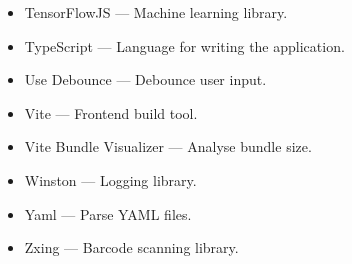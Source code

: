 \documentclass[11pt, twoside, a4paper]{report}
\begin{document}
\begin{itemize}
    \item TensorFlowJS --- Machine learning library.
    \item TypeScript --- Language for writing the application.
    \item Use Debounce --- Debounce user input.
    \item Vite --- Frontend build tool.
    \item Vite Bundle Visualizer --- Analyse bundle size.
    \item Winston --- Logging library.
    \item Yaml --- Parse YAML files.
    \item Zxing --- Barcode scanning library.
\end{itemize}

\printbibliography[title=Bibliography,notcategory=cited]{}
\end{document}
